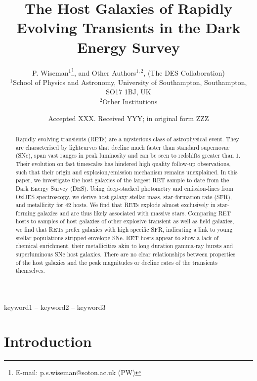 \documentclass[fleqn,usenatbib,]{mnras}
\title[RET host galaxies in DES]{The Host Galaxies of Rapidly Evolving Transients in the Dark Energy Survey}
\author[P. Wiseman et al.]{
P. Wiseman$^1$\thanks{E-mail: p.s.wiseman@soton.ac.uk (PW)},
 and Other Authors$^{1,2}$,
\newauthor
(The DES Collaboration)
\\
$^{1}$School of Physics and Astronomy, University of Southampton, Southampton, SO17 1BJ, UK\\
$^{2}$Other Institutions\\
}
\date{Accepted XXX. Received YYY; in original form ZZZ}
\begin{document}
\label{firstpage}
\pagerange{\pageref{firstpage}--\pageref{lastpage}}
\maketitle

\begin{abstract}
Rapidly evolving transients (RETs) are a mysterious class of astrophysical event. They are characterised by lightcurves that decline much faster than standard supernovae (SNe), span vast ranges in peak luminosity and can be seen to redshifts greater than 1. Their evolution on fast timescales has hindered high quality follow-up observations, such that their origin and explosion/emission mechanism remains unexplained. In this paper, we investigate the host galaxies of the largest RET sample to date from the Dark Energy Survey (DES). Using deep-stacked photometry and emission-lines from OzDES spectroscopy, we derive host galaxy stellar mass, star-formation rate (SFR), and metallicity for 42 hosts. We find that RETs explode almost exclusively in star-forming galaxies and are thus likely associated with massive stars. Comparing RET hosts to samples of host galaxies of other explosive transient as well as field galaxies, we find that RETs prefer galaxies with high specific SFR, indicating a link to young stellar populations stripped-envelope SNe. RET hosts appear to show a lack of chemical enrichment, their metallicities akin to long duration gamma-ray bursts and superluminous SNe host galaxies. There are no clear relationships between properties of the host galaxies and the peak magnitudes or decline rates of the transients themselves.

\end{abstract}

\begin{keywords}
keyword1 -- keyword2 -- keyword3
\end{keywords}



\section{Introduction}
\end{document}
